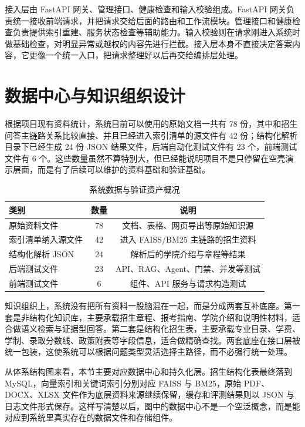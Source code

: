 \documentclass[UTF8,zihao=-4,oneside]{ctexbook}
\numberwithin{equation}{chapter}
\begin{document}
接入层由 FastAPI 网关、管理接口、健康检查和输入校验组成。FastAPI 网关负责统一接收前端请求，并把请求交给后面的路由和工作流模块。管理接口和健康检查负责提供索引重建、服务状态检查等辅助能力。输入校验则在请求刚进入系统时做基础检查，对明显异常或越权的内容先进行拦截。接入层本身不直接决定答案内容，它更像一个统一入口，把请求整理好以后再交给编排层处理。

\section{数据中心与知识组织设计}
根据项目现有资料统计，系统目前可以使用的原始文档一共有 78 份，其中和招生问答主链路关系比较直接、并且已经进入索引清单的源文件有 42 份；结构化解析目录下已经生成 24 份 JSON 结果文件，后端自动化测试文件有 23 个，前端测试文件有 6 个。这些数量虽然不算特别大，但已经能说明项目不是只停留在空壳演示层面，而是有了后续可以维护的资料基础和验证基础。

\begin{table}[H]
  \centering
  \caption{系统数据与验证资产概况}
  \begin{tabular}{lcc}
    \toprule
    类别 & 数量 & 说明 \\
    \midrule
    原始资料文件 & 78 & 文档、表格、网页导出等原始知识源 \\
    索引清单纳入源文件 & 42 & 进入 FAISS/BM25 主链路的招生资料 \\
    结构化解析 JSON & 24 & 解析后的学院介绍与章程等结果 \\
    后端测试文件 & 23 & API、RAG、Agent、门禁、并发等测试 \\
    前端测试文件 & 6 & 组件、API 服务与请求构造测试 \\
    \bottomrule
  \end{tabular}
\end{table}

知识组织上，系统没有把所有资料一股脑混在一起，而是分成两套互补底座。第一套是非结构化知识库，主要承载招生章程、报考指南、学院介绍和说明性材料，适合做语义检索与证据型回答。第二套是结构化招生表，主要承载专业目录、学费、学制、录取分数线、政策附表等字段信息，适合做精确查找。两套底座在接口层被统一包装，这使系统可以根据问题类型灵活选择主路径，而不必强行统一处理。

从体系结构图来看，本节主要对应数据中心和持久化层。招生结构化表最终落到 MySQL，向量索引和关键词索引分别对应 FAISS 与 BM25，原始 PDF、DOCX、XLSX 文件作为底层资料来源继续保留，缓存和评测结果则以 JSON 与日志文件形式保存。这样写清楚以后，图中的数据中心不是一个空泛概念，而是能对应到系统里真实存在的数据文件和存储组件。
\end{document}
